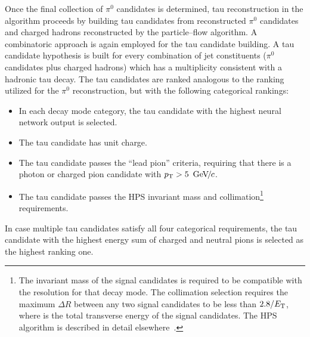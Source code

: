 Once the final collection of $\pi^0$ candidates is determined, tau
reconstruction in the \hpsTanc algorithm proceeds by building tau candidates
from reconstructed $\pi^0$ candidates and charged hadrons reconstructed by the
particle--flow algorithm.  A combinatoric approach is again employed for the tau
candidate building.  A tau candidate hypothesis is built for every combination
of jet constituents ($\pi^0$ candidates plus charged hadrons) which has a
multiplicity consistent with a hadronic tau decay.  The tau candidates are
ranked analogous to the ranking utilized for the $\pi^0$ reconstruction, but
with the following categorical rankings:
\begin{itemize}
\item In each decay mode category, the tau candidate with the highest neural network output is selected.
\item The tau candidate has unit charge.
\item The tau candidate passes the ``lead pion'' criteria, requiring that there
  is a photon or charged pion candidate with $p_{\mathrm{T}} > 5~{\,\text{Ge\hspace{-.08em}V\hspace{-0.16em}/\hspace{-0.08em}}c}$.
\item The tau candidate passes the HPS invariant mass and 
  collimation\footnote{The invariant mass of the signal candidates is required
  to be compatible with the resolution for that decay mode.  The collimation
  selection requires the maximum $\Delta R$ between any two signal candidates to
  be less than $2.8/E_{\mathrm{T}}$, where \et is the total transverse energy of the signal
  candidates.  The HPS algorithm is described in detail elsewhere~\cite{CMS_AN_2010-082}.}
  requirements.
\end{itemize}  
In case multiple tau candidates satisfy all four categorical requirements,  the
tau candidate with the highest energy sum of charged and neutral pions is
selected as the highest ranking one.

